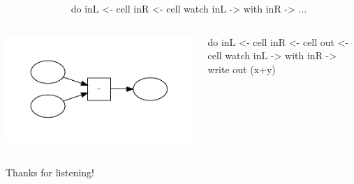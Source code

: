 \documentclass[UKenglish,usenames,dvipsnames,svgnames,table,aspectratio=169,mathserif]{beamer}
\begin{document}
\begin{frame}[fragile]
\begin{columns}
\begin{column}{0.5\textwidth}
\huge

\end{column}
\begin{column}{0.5\textwidth}
\begin{haskellcode}
do
  inL <- cell
  inR <- cell
  watch inL \x ->
    with inR \y ->
    ...
\end{haskellcode}
\end{column}
\end{columns}
\end{frame}

\begin{frame}[fragile]
\begin{columns}
\begin{column}{0.5\textwidth}
\includegraphics{prop2.pdf}
\end{column}
\begin{column}{0.5\textwidth}
\begin{haskellcode}
do
  inL <- cell
  inR <- cell
  out <- cell
  watch inL \x ->
    with inR \y ->
    write out (x+y)
\end{haskellcode}
\end{column}
\end{columns}
\end{frame}


\begin{frame}
\Huge

\end{frame}



\fi

\begin{frame}
\huge \centering
Thanks for listening!
\end{frame}
\end{document}

